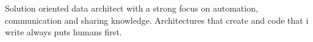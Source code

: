 \documentclass[letter,10pt]{article}
\begin{document}
Solution oriented data architect with a strong focus on automation, communication and sharing knowledge. Architectures that create and code that i write always puts humans first.
\end{document}
